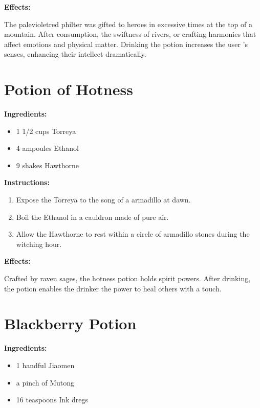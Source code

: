 \documentclass{article}
\begin{document}
\textbf{Effects:}

The palevioletred philter was gifted to heroes in excessive times at the top of a mountain. After consumption, the swiftness of rivers, or crafting harmonies that affect emotions and physical matter. Drinking the potion increases the user 's senses, enhancing their intellect dramatically.

\newpage
\section*{Potion of Hotness}

\textbf{Ingredients:}

\begin{itemize}
  \item 1 1/2 cups Torreya
  \item 4 ampoules Ethanol
  \item 9 shakes Hawthorne
\end{itemize}

\textbf{Instructions:}

\begin{enumerate}
  \item Expose the Torreya to the song of a armadillo at dawn.
  \item Boil the Ethanol in a cauldron made of pure air.
  \item Allow the Hawthorne to rest within a circle of armadillo stones during the witching hour.
\end{enumerate}

\textbf{Effects:}

Crafted by raven sages, the hotness potion holds spirit powers. After drinking, the potion enables the drinker the power to heal others with a touch.

\newpage
\section*{Blackberry Potion}

\textbf{Ingredients:}

\begin{itemize}
  \item 1 handful Jiaomen
  \item a pinch of Mutong
  \item 16 teaspoons Ink dregs
\end{itemize}
\end{document}
